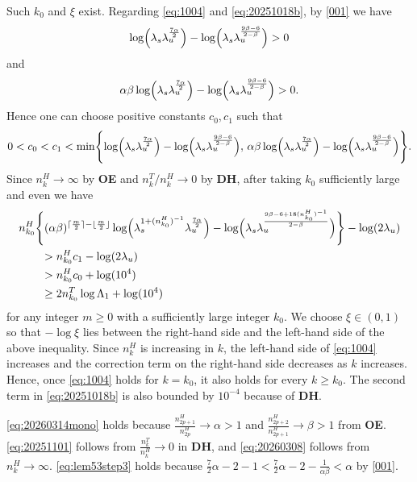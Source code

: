\documentclass{amsart}
\theoremstyle{plain}
\theoremstyle{definition}
\theoremstyle{remark}
\numberwithin{equation}{section}
\begin{document}
Such $k_0$ and $\xi$ exist.
Regarding \eqref{eq:1004} and \eqref{eq:20251018b}, by \eqref{001} we have
\[
\log\Bigl(\lambda_s\lambda_u^{\frac{7\alpha}{2}}\Bigr)
-\log\Bigl(\lambda_s\lambda_u^{\frac{9\beta-6}{2-\beta}}\Bigr)>0
\]
and
\[
\alpha\beta\log\Bigl(\lambda_s\lambda_u^{\frac{7\alpha}{2}}\Bigr)
-\log\Bigl(\lambda_s\lambda_u^{\frac{9\beta-6}{2-\beta}}\Bigr)>0.
\]
Hence one can choose positive constants $c_0,c_1$ such that
\[
0<c_0<c_1<
\min\Biggl\{
\log\Bigl(\lambda_s\lambda_u^{\frac{7\alpha}{2}}\Bigr)
-\log\Bigl(\lambda_s\lambda_u^{\frac{9\beta-6}{2-\beta}}\Bigr),\,
\alpha\beta\log\Bigl(\lambda_s\lambda_u^{\frac{7\alpha}{2}}\Bigr)
-\log\Bigl(\lambda_s\lambda_u^{\frac{9\beta-6}{2-\beta}}\Bigr)
\Biggr\}.
\]
Since $n_k^H\to\infty$ by {\bf OE} and $n_k^T/n_k^H\to0$ by {\bf DH}, after taking $k_0$ sufficiently large and even we have
\begin{align*}
&n_{k_0}^H\Biggl\{
(\alpha\beta)^{\lceil\frac{m}{2}\rceil-\lfloor\frac{m}{2}\rfloor}
\log\Bigl(\lambda_s^{1+(n_{k_0}^H)^{-1}}\lambda_u^{\frac{7\alpha}{2}}\Bigr)
-\log\Bigl(\lambda_s\lambda_u^{\frac{9\beta-6+18(n_{k_0}^H)^{-1}}{2-\beta}}\Bigr)
\Biggr\}
-\log(2\lambda_u)\\
&\qquad > n_{k_0}^Hc_1-\log(2\lambda_u)\\
&\qquad > n_{k_0}^Hc_0+\log(10^4)\\
&\qquad \ge 2n_{k_0}^T\log\Lambda_1+\log(10^4)
\end{align*}
for any integer $m\ge 0$ with a sufficiently large integer $k_0$.
We choose $\xi \in (0,1)$ so that $-\log\xi$ lies between the right-hand side and the left-hand side of the above inequality.
Since $n_k^H$ is increasing in $k$, the left-hand side of \eqref{eq:1004} increases and the correction term on the right-hand side decreases as $k$ increases. Hence, once \eqref{eq:1004} holds for $k=k_0$, it also holds for every $k\ge k_0$.
The second term in \eqref{eq:20251018b} is also bounded by $10^{-4}$ because of {\bf DH}.

\eqref{eq:20260314mono} holds because 
$
\frac{n_{2p+1}^H}{n_{2p}^H}\to\alpha>1$
and
$\frac{n_{2p+2}^H}{n_{2p+1}^H}\to\beta>1
$
from {\bf OE}.
\eqref{eq:20251101} follows from $\frac{n_k^T}{n_k^H}\to 0$ in {\bf DH}, and \eqref{eq:20260308} follows from $n_k^H\to \infty$.
\eqref{eq:lem53step3} holds because $\frac{7}{2}\alpha-2-1<\frac{7}{2}\alpha-2-\frac{1}{\alpha\beta}<\alpha$ by \eqref{001}.
\end{document}
